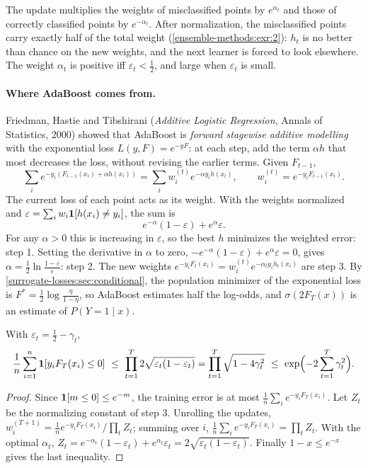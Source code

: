 \begin{notechapter}
The update multiplies the weights of misclassified points by $e^{\alpha_t}$ and those of correctly
classified points by $e^{-\alpha_t}$. After normalization, the misclassified points carry exactly
half of the total weight (\cref{ensemble-methods:exr:2}): $h_t$ is no better than chance on the new
weights, and the next learner is forced to look elsewhere. The weight $\alpha_t$ is positive iff
$\varepsilon_t<\frac12$, and large when $\varepsilon_t$ is small.

\paragraph{Where AdaBoost comes from.} Friedman, Hastie and Tibshirani (\emph{Additive
Logistic Regression}, Annals of Statistics, 2000) showed that AdaBoost is \emph{forward
stagewise additive modelling} with the exponential loss $L(y, F) = e^{-yF}$: at each step, add
the term $\alpha h$ that most decreases the loss, without revising the earlier terms. Given
$F_{t-1}$,
\[
  \sum_ie^{-y_i(F_{t-1}(x_i) + \alpha h(x_i))} = \sum_iw_i^{(t)}e^{-\alpha y_ih(x_i)},\qquad w_i^{(t)} = e^{-y_iF_{t-1}(x_i)} .
\]
The current loss of each point acts as its weight. With the weights normalized and
$\varepsilon = \sum_iw_i\mathbf{1}[h(x_i)\neq y_i]$, the sum is
\[
  e^{-\alpha}(1 - \varepsilon) + e^{\alpha}\varepsilon .
\]
For any $\alpha>0$ this is increasing in $\varepsilon$, so the best $h$ minimizes the weighted error: step 1.
Setting the derivative in $\alpha$ to zero, $-e^{-\alpha}(1 - \varepsilon) + e^\alpha\varepsilon = 0$, gives $\alpha = \frac12\ln\frac{1 - \varepsilon}\varepsilon$: step 2. The
new weights $e^{-y_iF_t(x_i)} = w_i^{(t)}e^{-\alpha_ty_ih_t(x_i)}$ are step 3. By \cref{surrogate-losses:sec:conditional}, the
population minimizer of the exponential loss is $F^* = \frac12\log\frac\eta{1 - \eta}$, so AdaBoost estimates half
the log-odds, and $\sigma(2F_T(x))$ is an estimate of $P(Y = 1\mid x)$.

\begin{theorem}\label{ensemble-methods:thm:training}
With $\varepsilon_t = \frac12 - \gamma_t$,
\[
  \frac1n\sum_{i=1}^n\bbone[y_iF_T(x_i)\leq0]\ \leq\ \prod_{t=1}^T2\sqrt{\varepsilon_t(1 - \varepsilon_t)}
  = \prod_{t=1}^T\sqrt{1 - 4\gamma_t^2}\ \leq\ \exp\Bigl(-2\sum_{t=1}^T\gamma_t^2\Bigr).
\]
\end{theorem}

\begin{proof}
Since $\mathbf{1}[m\leq0]\leq e^{-m}$, the training error is at most $\frac1n\sum_ie^{-y_iF_T(x_i)}$. Let $Z_t$ be the
normalizing constant of step 3. Unrolling the updates,
$w_i^{(T+1)} = \frac1n e^{-y_iF_T(x_i)}/\prod_tZ_t$; summing over $i$, $\frac1n\sum_ie^{-y_iF_T(x_i)} = \prod_tZ_t$. With the optimal $\alpha_t$,
$Z_t = e^{-\alpha_t}(1 - \varepsilon_t) + e^{\alpha_t}\varepsilon_t = 2\sqrt{\varepsilon_t(1 - \varepsilon_t)}$. Finally $1 - x\leq e^{-x}$ gives the last inequality.
\end{proof}


\end{notechapter}
